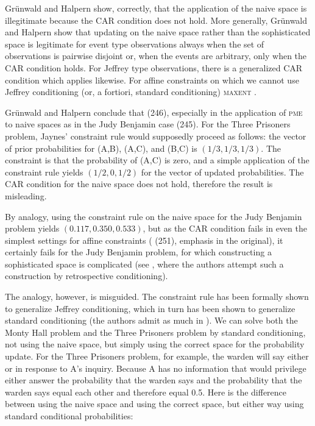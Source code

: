 \documentclass[phd,12pt,oneside]{ubcthesis}
\begin{document}
Gr{\"u}nwald and Halpern show, correctly, that the application of the
naive space is illegitimate because the CAR condition does not hold.
More generally, Gr{\"u}nwald and Halpern show that updating on the
naive space rather than the sophisticated space is legitimate for
event type observations always when the set of observations is
pairwise disjoint or, when the events are arbitrary, only when the CAR
condition holds. For Jeffrey type observations, there is a generalized
CAR condition which applies likewise. For affine constraints on which
we cannot use Jeffrey conditioning (or, a fortiori, standard
conditioning) \textsc{maxent } .

Gr{\"u}nwald and Halpern conclude that  (246), especially in the application of
\textsc{pme} to naive spaces as in the Judy Benjamin case
 (245). For the Three Prisoners problem,
Jaynes' constraint rule would supposedly proceed as follows: the
vector of prior probabilities for (A,B), (A,C), and (B,C) is
$(1/3,1/3,1/3)$. The constraint is that the probability of (A,C) is
zero, and a simple application of the constraint rule yields
$(1/2,0,1/2)$ for the vector of updated probabilities. The CAR
condition for the naive space does not hold, therefore the result is
misleading.

By analogy, using the constraint rule on the naive space for the Judy
Benjamin problem yields $(0.117,0.350,0.533)$, but as the CAR
condition fails in even the simplest settings for affine constraints
( (251), emphasis in the original),
it certainly fails for the Judy Benjamin problem, for which
constructing a sophisticated space is complicated (see
, where the authors attempt such a
construction by retrospective conditioning).

The analogy, however, is misguided. The constraint rule has been
formally shown to generalize Jeffrey conditioning, which in turn has
been shown to generalize standard conditioning (the authors admit as
much in ). We can solve both the
Monty Hall problem and the Three Prisoners problem by standard
conditioning, not using the naive space, but simply using the correct
space for the probability update. For the Three Prisoners problem, for
example, the warden will say either  or  in response
to A's inquiry. Because A has no information that would privilege
either answer the probability that the warden says  and the
probability that the warden says  equal each other and
therefore equal 0.5. Here is the difference between using the naive
space and using the correct space, but either way using standard
conditional probabilities:
\end{document}
